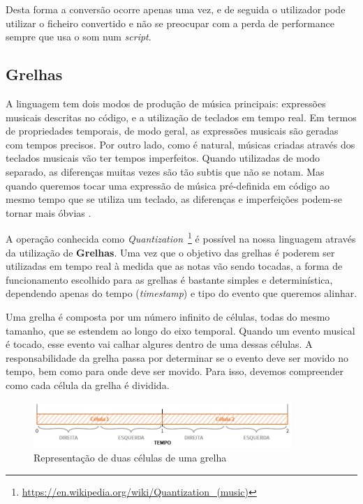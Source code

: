 Desta forma a conversão ocorre apenas uma vez, e de seguida o utilizador pode utilizar o ficheiro convertido e não se preocupar com a perda de performance sempre que usa o som num \textit{script}.

\subsection{Grelhas}
A linguagem tem dois modos de produção de música principais: expressões musicais descritas no código, e a utilização de teclados em tempo real. Em termos de propriedades temporais, de modo geral, as expressões musicais são geradas com tempos precisos. Por outro lado, como é natural, músicas criadas através dos teclados musicais vão ter tempos imperfeitos. Quando utilizadas de modo separado, as diferenças muitas vezes são tão subtis que não se notam. Mas quando queremos tocar uma expressão de música pré-definida em código ao mesmo tempo que se utiliza um teclado, as diferenças e imperfeições podem-se tornar mais óbvias \citep{doi:10.1177/1029864913486793}.

A operação conhecida como \textit{Quantization}~\footnote{\url{https://en.wikipedia.org/wiki/Quantization_(music)}} é possível na nossa linguagem através da utilização de \textbf{Grelhas}. Uma vez que o objetivo das grelhas é poderem ser utilizadas em tempo real à medida que as notas vão sendo tocadas, a forma de funcionamento escolhido para as grelhas é bastante simples e determinística, dependendo apenas do tempo (\textit{timestamp}) e tipo do evento que queremos alinhar.

Uma grelha é composta por um número infinito de células, todas do mesmo tamanho, que se estendem ao longo do eixo temporal. Quando um evento musical é tocado, esse evento vai calhar algures dentro de uma dessas células. A responsabilidade da grelha passa por determinar se o evento deve ser movido no tempo, bem como para onde deve ser movido. Para isso, devemos compreender como cada célula da grelha é dividida.

\begin{figure}[h]
\begin{center}
    \includegraphics[width=0.87\textwidth]{img/grids_1.png}
\end{center}
\caption{Representação de duas células de uma grelha}
\label{fig:grids-1}
\end{figure}

